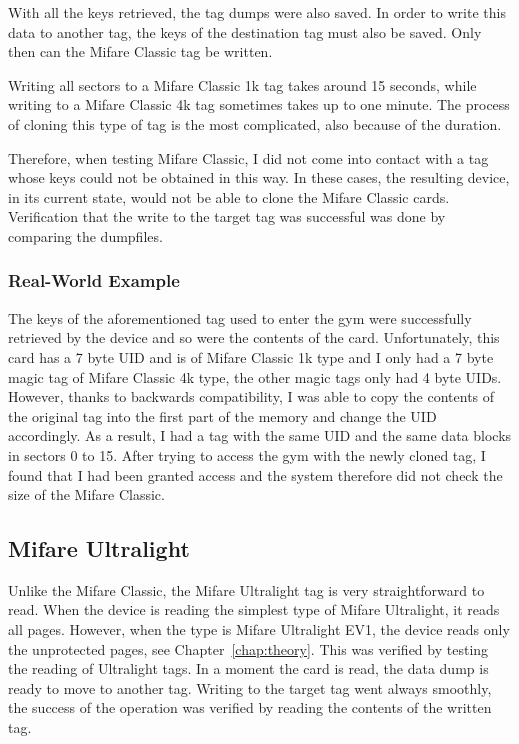 With all the keys retrieved, the tag dumps were also saved. In order to write this data to another tag, the keys of the destination tag must also be saved. Only then can the Mifare Classic tag be written.

Writing all sectors to a Mifare Classic 1k tag takes around 15 seconds, while writing to a Mifare Classic 4k tag sometimes takes up to one minute. The process of cloning this type of tag is the most complicated, also because of the duration.

Therefore, when testing Mifare Classic, I did not come into contact with a tag whose keys could not be obtained in this way. In these cases, the resulting device, in its current state, would not be able to clone the Mifare Classic cards. Verification that the write to the target tag was successful was done by comparing the dumpfiles.

\subsubsection{Real-World Example}
The keys of the aforementioned tag used to enter the gym were successfully retrieved by the device and so were the contents of the card. Unfortunately, this card has a 7 byte UID and is of Mifare Classic 1k type and I only had a 7 byte magic tag of Mifare Classic 4k type, the other magic tags only had 4 byte UIDs. However, thanks to backwards compatibility, I was able to copy the contents of the original tag into the first part of the memory and change the UID accordingly. As a result, I had a tag with the same UID and the same data blocks in sectors 0 to 15. After trying to access the gym with the newly cloned tag, I found that I had been granted access and the system therefore did not check the size of the Mifare Classic.

\subsection{Mifare Ultralight}

Unlike the Mifare Classic, the Mifare Ultralight tag is very straightforward to read. When the device is reading the simplest type of Mifare Ultralight, it reads all pages. However, when the type is Mifare Ultralight EV1, the device reads only the unprotected pages, see Chapter~\ref{chap:theory}. This was verified by testing the reading of Ultralight tags. In a moment the card is read, the data dump is ready to move to another tag. Writing to the target tag went always smoothly, the success of the operation was verified by reading the contents of the written tag. 

